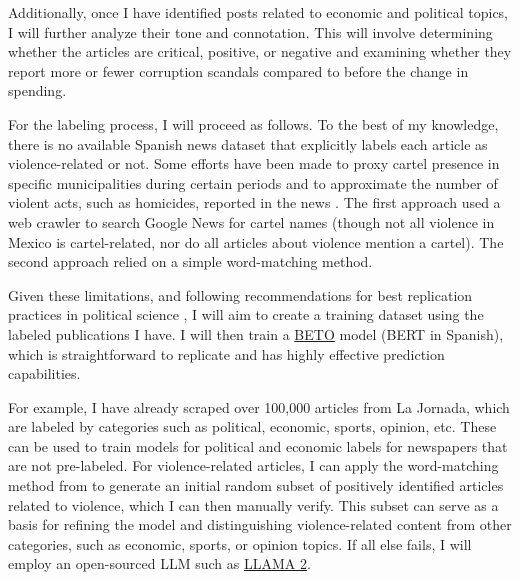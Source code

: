 Additionally, once I have identified posts related to economic and political topics, I will further analyze their tone and connotation. This will involve determining whether the articles are critical, positive, or negative and examining whether they report more or fewer corruption scandals compared to before the change in spending.

For the labeling process, I will proceed as follows. To the best of my knowledge, there is no available Spanish news dataset that explicitly labels each article as violence-related or not. Some efforts have been made to proxy cartel presence in specific municipalities during certain periods \citep{SobrinoCartel} and to approximate the number of violent acts, such as homicides, reported in the news \citep{Marshall}. The first approach used a web crawler to search Google News for cartel names (though not all violence in Mexico is cartel-related, nor do all articles about violence mention a cartel). The second approach relied on a simple word-matching method.

Given these limitations, and following recommendations for best replication practices in political science \citep{Spirling-Trust}, I will aim to create a training dataset using the labeled publications I have. I will then train a \href{https://github.com/dccuchile/beto}{BETO} model (BERT in Spanish), which is straightforward to replicate and has highly effective prediction capabilities.

For example, I have already scraped over 100,000 articles from La Jornada, which are labeled by categories such as political, economic, sports, opinion, etc. These can be used to train models for political and economic labels for newspapers that are not pre-labeled. For violence-related articles, I can apply the word-matching method from \citep{Marshall} to generate an initial random subset of positively identified articles related to violence, which I can then manually verify. This subset can serve as a basis for refining the model and distinguishing violence-related content from other categories, such as economic, sports, or opinion topics. If all else fails, I will employ an open-sourced LLM such as \href{https://www.llama.com/llama2/}{LLAMA 2}.